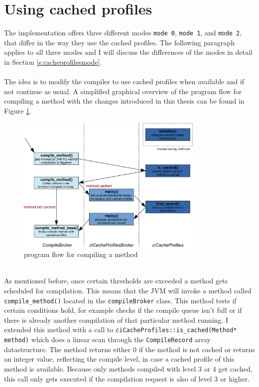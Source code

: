 \section{Using cached profiles}
\label{s:usingprofiles}
The implementation offers three different modes \texttt{mode 0}, \texttt{mode 1}, and \texttt{mode 2}, that differ in the way they use the cached profiles.
The following paragraph applies to all three modes and I will discuss the differences of the modes in detail in Section \ref{s:cacheprofilesmode}.
\\\\
The idea is to modify the compiler to use cached profiles when available and if not continue as usual.
A simplified graphical overview of the program flow for compiling a method with the changes introduced in this thesis can be found in Figure \ref{f:programflow}.
\begin{figure}[ht!]
  \begin{center}
    \centering
    \includegraphics[width=0.8\textwidth]{figures/program_flow.png}
    \caption{program flow for compiling a method}
    \label{f:programflow}
  \end{center}
\end{figure}\\
As mentioned before, once certain thresholds are exceeded a method gets scheduled for compilation. This means that the JVM will invoke a method called \texttt{compile\_method()} located in the \texttt{compileBroker} class. This method tests if certain conditions hold, for example checks if the compile queue isn't full or if there is already another compilation of that particular method running.
I extended this method with a call to \texttt{ciCacheProfiles::is\_cached(Method* method)} which does a linear scan through the \texttt{CompileRecord} array datastructure. The method returns either 0 if the method is not cached or returns an integer value, reflecting the compile level, in case a cached profile of this method is available. Because only methods compiled with level 3 or 4 get cached, this call only gets executed if the compilation request is also of level 3 or higher.\\\\
